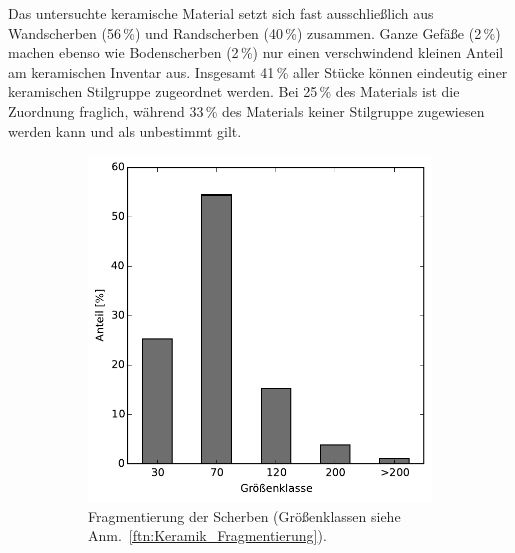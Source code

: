 \begin{multicols}{2}
Das untersuchte keramische Material setzt sich fast ausschließlich aus Wandscherben (56\,\%) und Randscherben (40\,\%) zusammen. Ganze Gefäße (2\,\%) machen ebenso wie Bodenscherben (2\,\%) nur einen verschwindend kleinen Anteil am keramischen Inventar aus. Insgesamt 41\,\% aller Stücke können eindeutig einer keramischen Stilgruppe zugeordnet werden. Bei 25\,\% des Materials ist die Zuordnung fraglich, während 33\,\% des Materials keiner Stilgruppe zugewiesen werden kann und als unbestimmt gilt.

\begin{figure}[!tb]
\centering
\begin{subfigure}{\columnwidth}
\centering
\includegraphics[height=.9\textwidth]{fig/2-2-1_KeramikFragmentierung.pdf}
\caption{Fragmentierung der Scherben (Größenklassen siehe Anm.~\ref{ftn:Keramik_Fragmentierung}).\newline}
\label{KeramikFragmentierung}
\end{subfigure}\hfill
\begin{subfigure}{\columnwidth}
\centering

\end{subfigure}
\end{figure}
\end{multicols}
